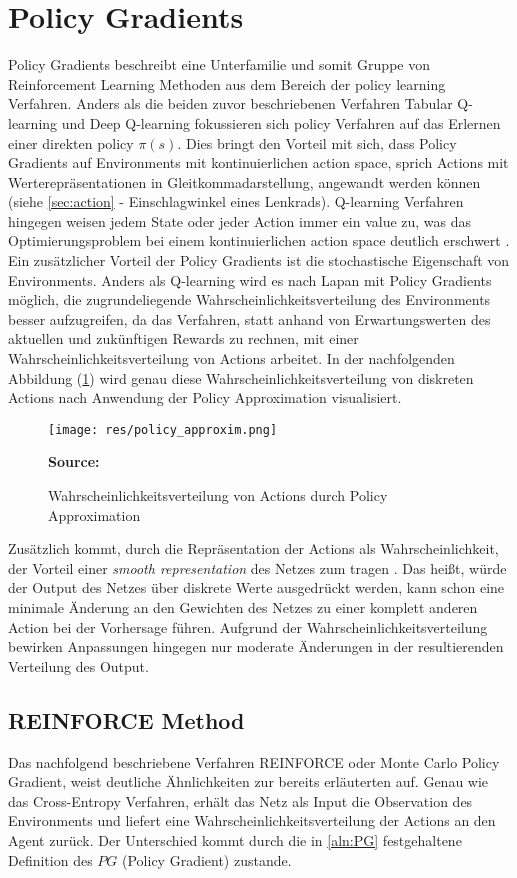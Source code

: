 \documentclass[11pt]{scrartcl}
\newcommand{\source}[1]{\vspace{-5pt} \caption*{\hfill \textbf{Source:} {#1}} }
\begin{document}
\section{Policy Gradients}
Policy Gradients beschreibt eine Unterfamilie und somit Gruppe von Reinforcement Learning 
Methoden aus dem Bereich der policy learning Verfahren. Anders als die beiden zuvor
beschriebenen Verfahren Tabular Q-learning und Deep Q-learning fokussieren sich policy
Verfahren auf das Erlernen einer direkten policy $\pi(s)$. Dies bringt den Vorteil mit sich,
dass Policy Gradients auf Environments mit kontinuierlichen action space, sprich Actions mit
Werterepräsentationen in Gleitkommadarstellung, angewandt werden können (siehe
\ref{sec:action}  - Einschlagwinkel eines Lenkrads). Q-learning Verfahren
hingegen weisen jedem State oder jeder Action immer ein value zu, was das Optimierungsproblem
bei einem kontinuierlichen action space deutlich erschwert \cite[~S.242]{L2018}. Ein
zusätzlicher Vorteil der Policy Gradients ist die stochastische Eigenschaft von Environments.
Anders als Q-learning wird es nach Lapan\cite[~S.242]{L2018} mit Policy Gradients möglich,
die zugrundeliegende Wahrscheinlichkeitsverteilung des Environments besser aufzugreifen,
da das Verfahren, statt anhand von Erwartungswerten des aktuellen und zukünftigen Rewards zu
rechnen, mit einer Wahrscheinlichkeitsverteilung von Actions arbeitet. In der nachfolgenden
Abbildung (\ref{fig:prob-dist-pg}) wird genau diese Wahrscheinlichkeitsverteilung von
diskreten Actions nach Anwendung der Policy Approximation visualisiert.

\begin{figure}[htp]
\centering
\texttt{[image: res/policy\_approxim.png]}
\caption{Wahrscheinlichkeitsverteilung von Actions durch Policy Approximation}
\source{\cite[~S.243 - Chapter 9 - Figure 1]{L2018}}
\label{fig:prob-dist-pg}
\end{figure}

Zusätzlich kommt, durch die Repräsentation der Actions als Wahrscheinlichkeit, der Vorteil einer
\textit{smooth representation} des Netzes zum tragen \cite[~S.243]{L2018}. 
Das heißt, würde der Output des Netzes über diskrete Werte ausgedrückt werden, kann schon eine
minimale Änderung an den Gewichten des Netzes zu einer komplett anderen Action bei der
Vorhersage führen. Aufgrund der Wahrscheinlichkeitsverteilung bewirken Anpassungen hingegen
nur moderate Änderungen in der resultierenden Verteilung des Output.


\subsection{REINFORCE Method}
Das nachfolgend beschriebene Verfahren REINFORCE oder Monte Carlo Policy Gradient, weist
deutliche Ähnlichkeiten zur bereits erläuterten  auf.
Genau wie das Cross-Entropy Verfahren, erhält das Netz als Input die Observation des
Environments und liefert eine Wahrscheinlichkeitsverteilung der Actions an den Agent
zurück. Der Unterschied kommt durch die in \autoref{aln:PG} festgehaltene Definition
des $PG$ (Policy Gradient) zustande.
\end{document}

